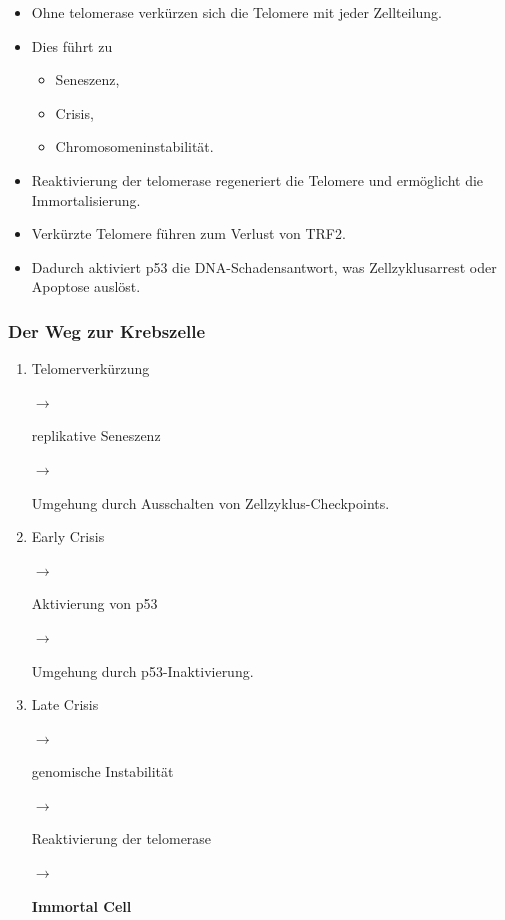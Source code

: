 \begin{itemize}

    \item Ohne \gls{telomerase} verkürzen sich die Telomere mit jeder Zellteilung.

    \item Dies führt zu

    \begin{itemize}
        \item Seneszenz,
        \item Crisis,
        \item Chromosomeninstabilität.
    \end{itemize}

    \item Reaktivierung der \gls{telomerase} regeneriert die Telomere
    und ermöglicht die Immortalisierung.

    \item Verkürzte Telomere führen zum Verlust von TRF2.

    \item Dadurch aktiviert p53 die DNA-Schadensantwort,
    was Zellzyklusarrest oder Apoptose auslöst.

\end{itemize}

\subsubsection*{Der Weg zur Krebszelle}

\begin{enumerate}

    \item Telomerverkürzung

    $\rightarrow$

    replikative Seneszenz

    $\rightarrow$

    Umgehung durch Ausschalten von Zellzyklus-Checkpoints.

    \item Early Crisis

    $\rightarrow$

    Aktivierung von p53

    $\rightarrow$

    Umgehung durch p53-Inaktivierung.

    \item Late Crisis

    $\rightarrow$

    genomische Instabilität

    $\rightarrow$

    Reaktivierung der \gls{telomerase}

    $\rightarrow$

    \textbf{Immortal Cell}

\end{enumerate}

